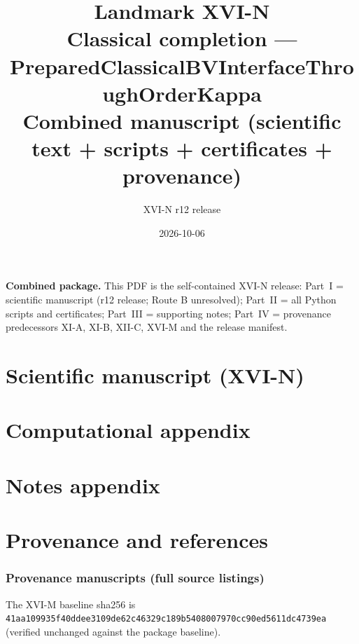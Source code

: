 \documentclass{article}
\title{Landmark XVI-N\\
\large Classical completion --- PreparedClassicalBVInterfaceThroughOrderKappa\\
\large Combined manuscript (scientific text + scripts + certificates + provenance)}
\author{XVI-N r12 release}
\date{2026-10-06}
\theoremstyle{remark}
\begin{document}
\maketitle
\noindent\textbf{Combined package.} This PDF is the self-contained XVI-N release:
Part~I = scientific manuscript (r12 release; Route B unresolved);
Part~II = all Python scripts and certificates;
Part~III = supporting notes;
Part~IV = provenance predecessors XI-A, XI-B, XII-C, XVI-M and the release manifest.

\tableofcontents
\newpage

\part{Scientific manuscript (XVI-N)}


\part{Computational appendix}


\part{Notes appendix}


\part{Provenance and references}
\section{Provenance manuscripts (full source listings)}
\label{app:prov}
The XVI-M baseline sha256 is
\texttt{41aa109935f40ddee3109de62c46329c189b5408007970cc90ed5611dc4739ea}
(verified unchanged against the package baseline).
\end{document}
